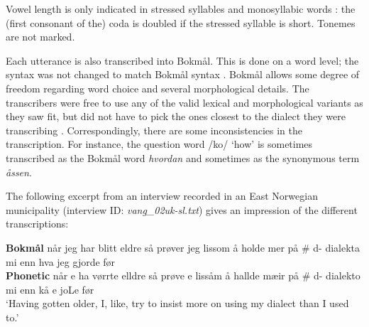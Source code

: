 Vowel length is only indicated in stressed syllables and monosyllabic words \cite[pp.~11--12]{johannessen2009transkripsjonsrettleiing}: the (first consonant of the) coda is doubled if the stressed syllable is short.
Tonemes are not marked.

Each utterance is also transcribed into Bokm{\aa}l.
This is done on a word level; the syntax was not changed to match Bokm{\aa}l syntax \cite[p.~2]{laake2009oversettelse}.
Bokm{\aa}l allows some degree of freedom regarding word choice and several morphological details.
The transcribers were free to use any of the valid lexical and morphological variants as they saw fit, but did not have to pick the ones closest to the dialect they were transcribing \cite[p.~2]{laake2009oversettelse}.
Correspondingly, there are some inconsistencies in the transcription.
For instance, the question word /ko\textrtails\textrtails{}/ `how' is sometimes transcribed as the Bokm\aa{}l word \textit{hvordan} and sometimes as the synonymous term \textit{\aa{}ssen}.

The following excerpt from an interview recorded in an East Norwegian municipality (interview ID: \textit{vang\_02uk-sl.txt}) gives an impression of the different transcriptions:

\begin{exe}
\ex
\gll
\textbf{Bokmål} når jeg har blitt eldre så prøver jeg lissom å holde mer på \# d- dialekta mi enn hva jeg gjorde før\\
\textbf{Phonetic} når e ha vørrte elldre så prøve e lissåm å hallde mæir på \# d- dialekto mi enn kå e joLe før\\
\trans `Having gotten older, I, like, try to insist more on using my dialect than I used to.'
\end{exe}

\FloatBarrier